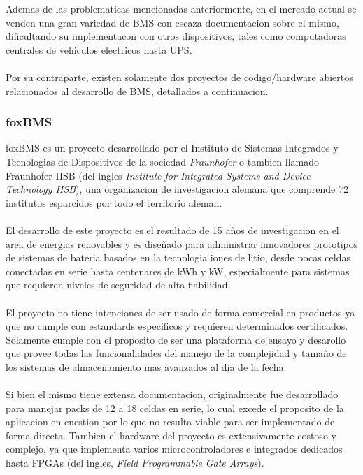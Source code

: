 \documentclass[10pt,a4paper]{article}
\begin{document}
    \noindent Ademas de las problematicas mencionadas anteriormente, en el 
    mercado actual se venden una gran variedad de BMS con escaza documentacion  
    sobre el mismo, dificultando su implementacon con otros dispositivos, tales
    como computadoras centrales de vehiculos electricos hasta UPS.\\
    \\
    \noindent Por su contraparte, existen solamente dos proyectos de 
    codigo/hardware abiertos relacionados al desarrollo de BMS, detallados a
    continuacion.

    \subsubsection{foxBMS}

    \noindent foxBMS es un proyecto desarrollado por el Instituto de Sistemas 
    Integrados y Tecnologias de Dispositivos de la sociedad \emph{Fraunhofer} o 
    tambien llamado Fraunhofer IISB (del ingles \emph{Institute for Integrated 
    Systems and Device Technology IISB}), una organizacion de investigacion 
    alemana que comprende 72 institutos esparcidos por todo el territorio
    aleman.\\
    \\
    \noindent El desarrollo de este proyecto es el resultado de 15 años de 
    investigacion en el area de energias renovables y es diseñado para 
    administrar innovadores prototipos de sistemas de bateria basados en la 
    tecnologia iones de litio, desde pocas celdas conectadas en serie hasta 
    centenares de kWh y kW, especialmente para sistemas que requieren niveles 
    de seguridad de alta fiabilidad.\\
    \\
    \noindent El proyecto no tiene intenciones de ser usado de forma comercial 
    en productos ya que no cumple con estandards especificos y requieren
    determinados certificados. Solamente cumple con el proposito de ser una
    plataforma de ensayo y desarollo que provee todas las funcionalidades del
    manejo de la complejidad y tamaño de los sistemas de almacenamiento mas
    avanzados al dia de la fecha.\\
    \\
    \noindent Si bien el mismo tiene extensa documentacion, originalmente fue
    desarrollado para manejar packs de 12 a 18 celdas en serie, lo cual excede
    el proposito de la aplicacion en cuestion por lo que no resulta viable para
    ser implementado de forma directa. Tambien el hardware del proyecto es
    extensivamente costoso y complejo, ya que implementa varios 
    microcontroladores e integrados dedicados hasta FPGAs 
    (del ingles, \emph{Field Programmable Gate Arrays}).
\end{document}

